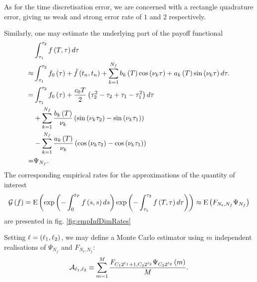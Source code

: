\documentclass[11pt]{amsart}
\begin{document}
As for the time discretisation error, we are concerned with a rectangle quadrature
error, giving us weak and strong error rate of $1$ and $2$ respectively.

Similarly, one may estimate the underlying part of the 
payoff functional
\begin{align*}
&\int_{\tau_1}^{\tau_2}
f \left( {T,\tau} \right) d\tau 
\\
\approx & \int_{\tau_1}^{\tau_2}
f_0 \left( {\tau} \right) + \tilde f \left( {t_n, t_n} \right) +
\displaystyle\sum\limits_{k=1}^{N_f}
b_k \left( {T} \right) \cos \left( {\nu_{k} \tau} \right) + a_k \left( {T} \right) \sin \left( {\nu_{k} \tau} \right)
d \tau.
\\
= & \int_{\tau_1}^{\tau_2}
f_0 \left( {\tau} \right)  + \frac{c_0 T}{2} \left( {\tau_2^2 - \tau_2 +\tau_1 - \tau_1^2} \right) d \tau
\\
&+
\displaystyle\sum\limits_{k=1}^{N_f} 
\frac{b_k \left( {T} \right)}{\nu_{k} } 
\left( {\sin \left( {\nu_{k} \tau_2} \right)  - \sin \left( {\nu_{k} \tau_1} \right) } \right)
\\
&-
\displaystyle\sum\limits_{k=1}^{N_f} 
\frac{a_k \left( {T} \right)}{\nu_{k}} 
\left( {\cos \left( {\nu_{k} \tau_2} \right)  - \cos \left( {\nu_{k} \tau_1} \right) } \right)
\\
=& \Psi_{N_f} .
\end{align*}
The corresponding empirical rates for the approximations of the quantity of interest
\begin{align*}
\mathcal G \left( {f} \right) =
\mathrm{E} \left( {{\mathrm{exp}\left ( {-\int_0^{t_{T}} f \left( {s,s} \right) ds}\right )\mathrm{exp}\left ( {-\int_{\tau_1}^{\tau_2} f \left( {T,\tau} \right) d\tau}\right )}} \right)
\approx
\mathrm{E} \left( {{
F_{N_t,N_f}
\Psi_{N_f} }} \right)
\end{align*}
are presented in fig. \ref{fig:empInfDimRates}


Setting $\ell = \left( {\ell_1 , \ell_2} \right)$, we may define a Monte
Carlo estimator using $m$ independent realisations of $\Psi_{N_f}$ and $F_{N_t,N_f}$:
\begin{align}
\mathcal A_{\ell_1, \ell_2} 
\equiv
\displaystyle\sum\limits_{m=1}^{M}
\frac{F_{C_1 2^{\ell_1}+1,C_2 2^{\ell_2}} \Psi_{C_2 2^{\ell_2} }\left( {m} \right)}{M}.
\end{align}
\end{document}

